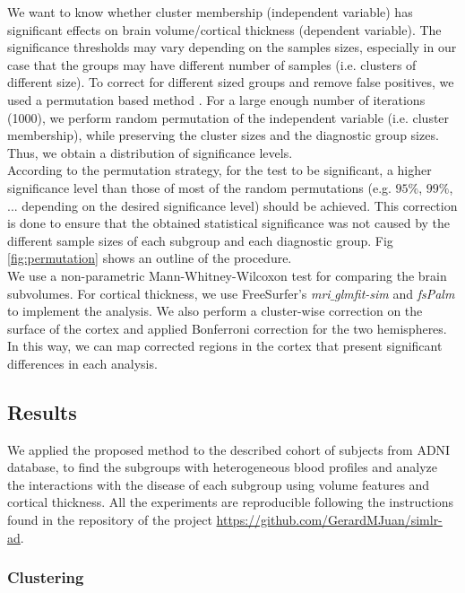 We want to know whether cluster membership (independent variable) has significant effects on brain volume/cortical thickness (dependent variable). The significance thresholds may vary depending on the samples sizes, especially in our case that the groups may have different number of samples (i.e. clusters of different size). To correct for different sized groups and remove false positives, we used a permutation based method \cite{Good2000}. For a large enough number of iterations (1000), we perform random permutation of the independent variable (i.e. cluster membership), while preserving the cluster sizes and the diagnostic group sizes. Thus, we obtain a distribution of significance levels. \\

According to the permutation strategy, for the test to be significant, a higher significance level than those of most of the random permutations (e.g. $95\%$, $99\%$, ... depending on the desired significance level) should be achieved. This correction is done to ensure that the obtained statistical significance was not caused by the different sample sizes of each subgroup and each diagnostic group. Fig \ref{fig:permutation} shows an outline of the procedure. \\

We use a non-parametric Mann-Whitney-Wilcoxon test for comparing the brain subvolumes. For cortical thickness, we use FreeSurfer's \textit{mri$\_$glmfit-sim} and \textit{fsPalm} to implement the analysis. We also perform a cluster-wise correction on the surface of the cortex and applied Bonferroni correction for the two hemispheres. In this way, we can map corrected regions in the cortex that present significant differences in each analysis. \\

\subsection{Results}

We applied the proposed method to the described cohort of subjects from ADNI database, to find the subgroups with heterogeneous blood profiles and analyze the interactions with the disease of each subgroup using volume features and cortical thickness. All the experiments are reproducible following the instructions found in the repository of the project \url{https://github.com/GerardMJuan/simlr-ad}.

\subsubsection{Clustering}

